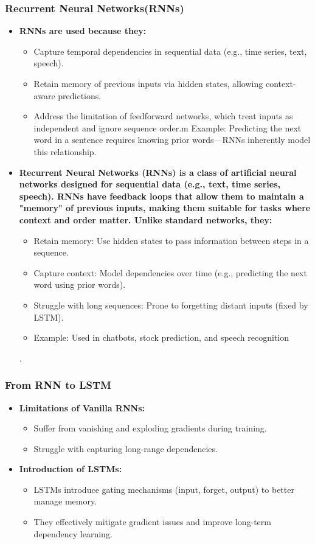 \documentclass{beamer}
\begin{document}
\begin{frame}
\frametitle{Recurrent Neural Networks(RNNs)}
\begin{itemize}
    \item \textbf{RNNs are used because they:}
    \begin{itemize}
        \item Capture temporal dependencies in sequential data (e.g., time series, text, speech).
        \item Retain memory of previous inputs via hidden states, allowing context-aware predictions.
    \ite\item Address the limitation of feedforward networks, which treat inputs as independent and ignore sequence order.m Example: Predicting the next word in a sentence requires knowing prior words—RNNs inherently model this relationship.    
    \end{itemize}
    \item \textbf{Recurrent Neural Networks (RNNs) is a class of artificial neural networks designed for sequential data (e.g., text, time series, speech). RNNs have feedback loops that allow them to maintain a "memory" of previous inputs, making them suitable for tasks where context and order matter. Unlike standard networks, they:}
    \begin{itemize}
        \item Retain memory: Use hidden states to pass information between steps in a sequence.
        \item Capture context: Model dependencies over time (e.g., predicting the next word using prior words).
        \item Struggle with long sequences: Prone to forgetting distant inputs (fixed by LSTM).
        \item Example: Used in chatbots, stock prediction, and speech recognition 
    \end{itemize}
    .
\end{itemize}
\end{frame}

\begin{frame}
\frametitle{From RNN to LSTM}
\begin{itemize}
    \item \textbf{Limitations of Vanilla RNNs:}
    \begin{itemize}
        \item Suffer from vanishing and exploding gradients during training.
        \item Struggle with capturing long-range dependencies.
    \end{itemize}
    \item \textbf{Introduction of LSTMs:}
    \begin{itemize}
        \item LSTMs introduce gating mechanisms (input, forget, output) to better manage memory.
        \item They effectively mitigate gradient issues and improve long-term dependency learning.
    \end{itemize}
\end{itemize}
\end{frame}
\end{document}
